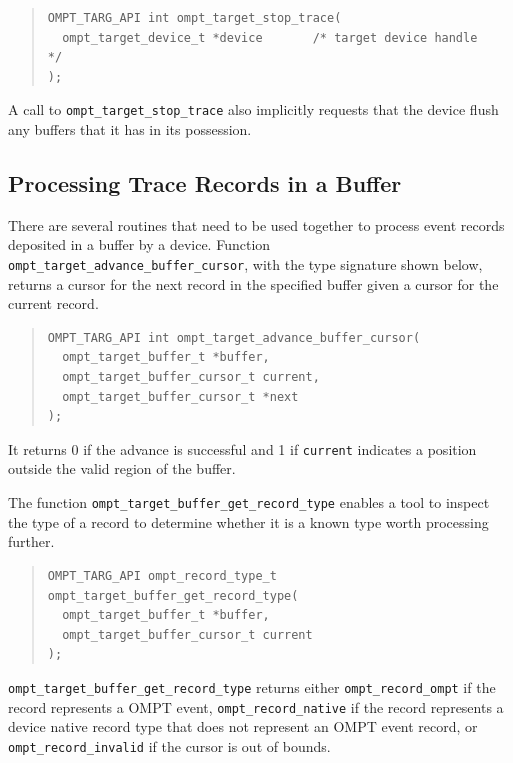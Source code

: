 \documentclass{article}
\begin{document}
\begin{quote}
\begin{verbatim}
OMPT_TARG_API int ompt_target_stop_trace(
  ompt_target_device_t *device       /* target device handle      */
);
\end{verbatim}
\end{quote}
\noindent
A call to \verb|ompt_target_stop_trace| also implicitly requests that the device flush any buffers that it has in its possession.

\subsection{Processing Trace Records in a Buffer}
\label{sec:record-data}

There are several routines that need to be used together to process %
event records deposited in a buffer by a device. Function \verb|ompt_target_advance_buffer_cursor|, with the type signature shown below, returns a cursor for the next record in the specified buffer given a cursor for the current record.

\begin{quote}
\begin{verbatim}
OMPT_TARG_API int ompt_target_advance_buffer_cursor(
  ompt_target_buffer_t *buffer, 
  ompt_target_buffer_cursor_t current, 
  ompt_target_buffer_cursor_t *next
); 
\end{verbatim}
\end{quote}
It returns 0 if the advance is successful and 1 if \verb|current| indicates a position outside the valid region of the buffer.

The function \verb|ompt_target_buffer_get_record_type| enables a tool to inspect the type of a record to determine whether it is a known type  worth processing further. 
\begin{quote}
\begin{verbatim}
OMPT_TARG_API ompt_record_type_t ompt_target_buffer_get_record_type(
  ompt_target_buffer_t *buffer, 
  ompt_target_buffer_cursor_t current
);
\end{verbatim}
\end{quote}
\sloppy
\verb|ompt_target_buffer_get_record_type| returns either \verb|ompt_record_ompt| if the record represents a OMPT event,  
\verb|ompt_record_native| if the record represents a device native record type that does not represent an OMPT event record, or \verb|ompt_record_invalid| if the cursor is out of bounds. 
\end{document}

